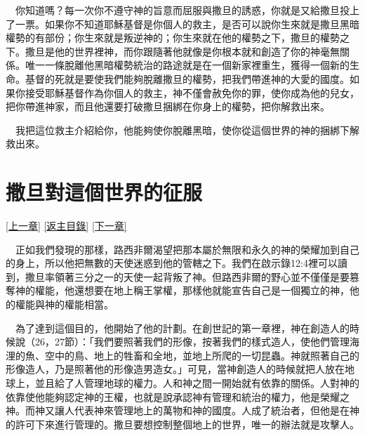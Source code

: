 \documentclass{book}
\begin{document}
　你知道嗎？每一次你不遵守神的旨意而屈服與撒旦的誘惑，你就是又給撒旦投上了一票。如果你不知道耶穌基督是你個人的救主，是否可以說你生來就是撒旦黑暗權勢的有部份；你生來就是叛逆神的；你生來就在他的權勢之下，撒旦的權勢之下。撒旦是他的世界裡神，而你跟隨著他就像是你根本就和創造了你的神毫無關係。唯一一條脫離他黑暗權勢統治的路途就是在一個新家裡重生，獲得一個新的生命。基督的死就是要使我們能夠脫離撒旦的權勢，把我們帶進神的大愛的國度。如果你接受耶穌基督作為你個人的救主，神不僅會赦免你的罪，使你成為他的兒女，把你帶進神家，而且他還要打破撒旦捆綁在你身上的權勢，把你解救出來。

　我把這位救主介紹給你，他能夠使你脫離黑暗，使你從這個世界的神的捆綁下解救出來。

\chapter{撒旦對這個世界的征服}
\label{sec:ch04}
\hyperref[sec:ch03]{[上一章]}
\hyperlink{toc}{[返主目錄]}
\hyperref[sec:ch05]{[下一章]}

\begin{center}
\noindent{}
\end{center}

　正如我們發現的那樣，路西非爾渴望把那本屬於無限和永久的神的榮耀加到自己的身上，所以他把無數的天使迷惑到他的管轄之下。我們在啟示錄12:4裡可以讀到，撒旦率領著三分之一的天使一起背叛了神。但路西非爾的野心並不僅僅是要篡奪神的權能，他還想要在地上稱王掌權，那樣他就能宣告自己是一個獨立的神，他的權能與神的權能相當。

　為了達到這個目的，他開始了他的計劃。在創世記的第一章裡，神在創造人的時候說（26，27節）：「我們要照著我們的形像，按著我們的樣式造人，使他們管理海浬的魚、空中的鳥、地上的牲畜和全地，並地上所爬的一切昆蟲。神就照著自己的形像造人，乃是照著他的形像造男造女。」可見，當神創造人的時候就把人放在地球上，並且給了人管理地球的權力。人和神之間一開始就有依靠的關係。人對神的依靠使他能夠認定神的王權，也就是說承認神有管理和統治的權力，他是榮耀之神。而神又讓人代表神來管理地上的萬物和神的國度。人成了統治者，但他是在神的許可下來進行管理的。撒旦要想控制整個地上的世界，唯一的辦法就是攻擊人。
\end{document}
